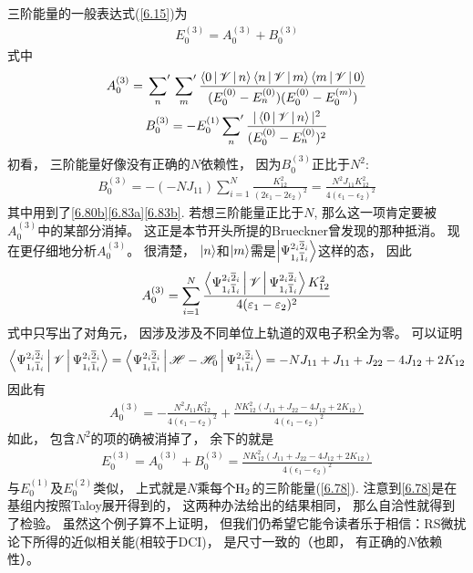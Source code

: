 三阶能量的一般表达式(\eqref{6.15})为
\begin{align}
E_0^{(3)} = A_0^{(3)} + B_{0}^{(3)}
\end{align}
式中
\begin{gather}
A_0^{(3)} = \sideset{}{'}\sum_n \sideset{}{'}\sum_m \frac{\Braket{0|\mathscr{V}|n}\Braket{n|\mathscr{V}|m}\Braket{m|\mathscr{V}|0}}{(E_0^{(0)} - E_n^{(0)}) (E_0^{(0)} - E_0^{(m)}) }\\
B_0^{(3)} = -E_0^{(1)}\sideset{}{'}{\sum}_n\frac{|\Braket{0|\mathscr{V}|n}|^2}{(E_0^{(0)} - E_n^{(0)})^2}
\end{gather}
初看，
三阶能量好像没有正确的$N$依赖性，
因为$B_0^{(3)}$正比于$N^2$:
\begin{align}
B_0^{(3)} = -(-NJ_{11}) \sum_{i=1}^{N} \frac{K_{12}^2}{(2\epsilon_1 - 2\epsilon_2)^2} = \frac{N^2J_{11}K_{12}^2}{4(\epsilon_1-\epsilon_2)^2}
\end{align}
其中用到了\eqref{6.80b}\eqref{6.83a}\eqref{6.83b}. 
若想三阶能量正比于$N$, 
那么这一项肯定要被$A_0^{(3)}$中的某部分消掉。
这正是本节开头所提的Brueckner曾发现的那种抵消。
现在更仔细地分析$A_0^{(3)}$。 
很清楚，
$\Ket{n}$和$\Ket{m}$需是$\Ket{\Psi_{1_i\overline{1}_i}^{2_i\overline{2}_i}}$这样的态，
因此
\begin{align}
A_0^{(3)} = \sum_{i=1}^{N} \frac{\Braket{\Psi_{1_i\overline{1}_i}^{2_i\overline{2}_i}|\mathscr{V}|\Psi_{1_i\overline{1}_i}^{2_i\overline{2}_i}}K_{12}^2}{4(\varepsilon_1 - \varepsilon_2)^2}
\end{align}
式中只写出了对角元，
因涉及涉及不同单位上轨道的双电子积全为零。
可以证明
\begin{align}\Braket{\Psi_{1_i\overline{1}_i}^{2_i\overline{2}_i}|\mathscr{V}|\Psi_{1_i\overline{1}_i}^{2_i\overline{2}_i}} = \Braket{\Psi_{1_i\overline{1}_i}^{2_i\overline{2}_i}|\mathscr{H}-\mathscr{H}_0|\Psi_{1_i\overline{1}_i}^{2_i\overline{2}_i}}=-NJ_{11} + J_{11} + J_{22} - 4J_{12} + 2K_{12}
\label{6.90}
\end{align}
因此有
\begin{align}
A_0^{(3)} = - \frac{N^2J_{11}K_{12}^2}{4(\epsilon_1 - \epsilon_2)^2} + \frac{NK_{12}^2(J_{11} + J_{22} - 4J_{12} + 2K_{12})}{4(\epsilon_1 - \epsilon_2)^2}
\end{align}
如此，
包含$N^2$的项的确被消掉了，
余下的就是
\begin{align}
E_0^{(3)} = A_0^{(3)} + B_0^{(3)} = \frac{NK_{12}^2(J_{11} + J_{22} - 4J_{12} + 2K_{12})}{4(\epsilon_1 - \epsilon_2)^2}
\label{eq:6.92}
\end{align}
与$E_0^{(1)}$及$E_0^{(2)}$类似，
上式就是$N$乘每个$\mathrm{H}_2$的三阶能量(\eqref{6.78}). 
注意到\eqref{6.78}是在基组内按照Taloy展开得到的，
这两种办法给出的结果相同，
那么自洽性就得到了检验。
虽然这个例子算不上证明，
但我们仍希望它能令读者乐于相信：RS微扰论下所得的近似相关能(相较于DCI)，
是尺寸一致的（也即，
有正确的$N$依赖性）。

